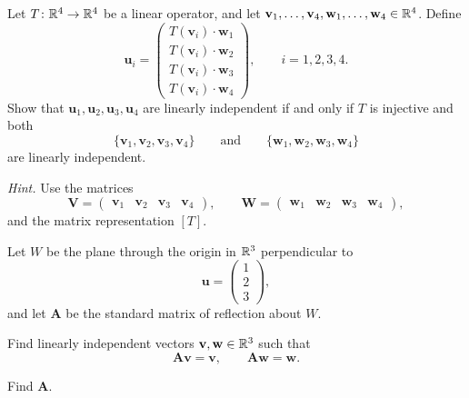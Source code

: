 \begin{problem}
Let $T\colon\mathbb{R}^4\to\mathbb{R}^4$ be a linear operator, and let $\mathbf v_1,\dots,\mathbf v_4,\mathbf w_1,\dots,\mathbf w_4\in\mathbb{R}^4$. Define
\[
\mathbf u_i=
\begin{pmatrix}
T(\mathbf v_i)\cdot\mathbf w_1\\
T(\mathbf v_i)\cdot\mathbf w_2\\
T(\mathbf v_i)\cdot\mathbf w_3\\
T(\mathbf v_i)\cdot\mathbf w_4
\end{pmatrix},
\qquad i=1,2,3,4.
\]
Show that $\mathbf u_1,\mathbf u_2,\mathbf u_3,\mathbf u_4$ are linearly independent if and only if $T$ is injective and both
\[
\{\mathbf v_1,\mathbf v_2,\mathbf v_3,\mathbf v_4\}
\qquad\text{and}\qquad
\{\mathbf w_1,\mathbf w_2,\mathbf w_3,\mathbf w_4\}
\]
are linearly independent.

\textit{Hint.} Use the matrices
\[
\mathbf V=\begin{pmatrix}\mathbf v_1&\mathbf v_2&\mathbf v_3&\mathbf v_4\end{pmatrix},
\qquad
\mathbf W=\begin{pmatrix}\mathbf w_1&\mathbf w_2&\mathbf w_3&\mathbf w_4\end{pmatrix},
\]
and the matrix representation $[T]$.
\end{problem}

\begin{problem}
Let $W$ be the plane through the origin in $\mathbb{R}^3$ perpendicular to
\[
\mathbf u=
\begin{pmatrix}
1\\2\\3
\end{pmatrix},
\]
and let $\mathbf A$ be the standard matrix of reflection about $W$.
\begin{problemsubparts}
\item Find linearly independent vectors $\mathbf v,\mathbf w\in\mathbb{R}^3$ such that
\[
\mathbf A\mathbf v=\mathbf v,
\qquad
\mathbf A\mathbf w=\mathbf w.
\]
\item Find $\mathbf A$.
\end{problemsubparts}
\end{problem}

